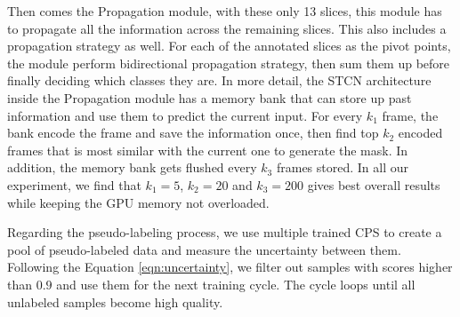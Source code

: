 Then comes the Propagation module, with these only 13 slices, this module has to propagate all the information across the remaining slices. This also includes a propagation strategy as well. For each of the annotated slices as the pivot points,
the module perform bidirectional propagation strategy, then sum them up before finally deciding which classes they are. 
In more detail, the STCN architecture inside the Propagation module has a memory bank that can store up past information and use them to predict the current input. For every $k_1$ frame, the bank encode the frame and save the information once, then find top $k_2$ encoded frames that is most similar with the current one to generate the mask. In addition, the memory bank gets flushed every $k_3$ frames stored. In all our experiment, we find that $k_1 = 5$, $k_2 = 20$ and $k_3 = 200$ gives best overall results while keeping the GPU memory not overloaded.

Regarding the pseudo-labeling process, we use multiple trained CPS to create a pool of pseudo-labeled data and measure the uncertainty between them. Following the Equation \ref{eqn:uncertainty}, we filter out samples with scores higher than $0.9$ and use them for the next training cycle. The cycle loops until all unlabeled samples become high quality.